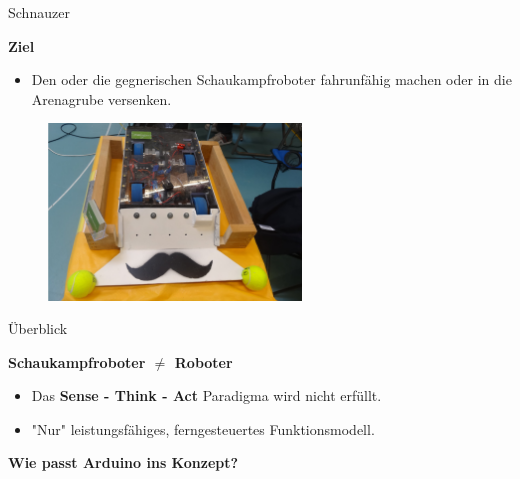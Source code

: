 \documentclass{beamer}
\begin{document}
\begin{frame}{Schnauzer}
\begin{large}\textbf{Ziel}\end{large}
\begin{itemize}
	\item Den oder die gegnerischen Schaukampfroboter fahrunf\"ahig machen oder in die Arenagrube versenken. \href{./videos/schnauzer.mp4}{}
\end{itemize}
 \begin{figure}[H]
  \centering
  \includegraphics[width=0.6\textwidth]{./images/robot-schnauzer.jpg}
 \end{figure}
\end{frame}
\begin{frame}{\"Uberblick}
\begin{large}\textbf{Schaukampfroboter $\neq$ Roboter}\end{large}
\begin{itemize}
	\item Das \textbf{Sense - Think - Act} Paradigma wird nicht erf\"ullt.
	\item "Nur" leistungsf\"ahiges, ferngesteuertes Funktionsmodell.
\end{itemize}
\vspace{20px}
\begin{large}\textbf{Wie passt Arduino ins Konzept?}\end{large}
\end{frame}
\end{document}
